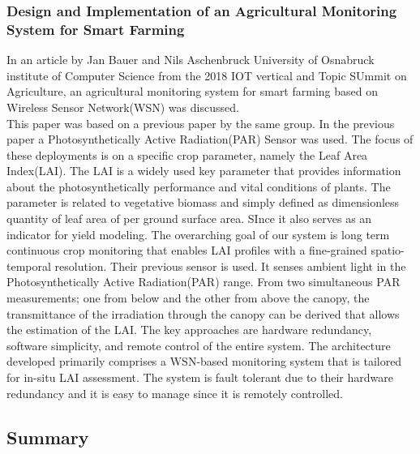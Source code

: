 \documentclass[12pt, a4paper]{article}
\begin{document}
\subsubsection{Design and Implementation of an Agricultural Monitoring System for Smart Farming}
In an article by Jan Bauer and Nils Aschenbruck University of Osnabruck institute of Computer Science from the 2018 IOT vertical and Topic SUmmit on Agriculture, an agricultural monitoring system for smart farming based on Wireless Sensor Network(WSN) was discussed.\\
This paper was based on a previous paper by the same group. In the previous paper a Photosynthetically Active Radiation(PAR) Sensor was used. The focus of these deployments is on a specific crop parameter, namely the Leaf Area Index(LAI). The LAI is a widely used key parameter that provides information about the photosynthetically performance and vital conditions of plants. The parameter is related to vegetative biomass and simply defined as dimensionless quantity of leaf area of per ground surface area. SInce it also serves as an indicator for yield modeling. The overarching goal of our system is long term continuous crop monitoring that enables LAI profiles with a fine-grained  spatio-temporal resolution. Their previous sensor is used. It senses ambient light in the Photosynthetically Active Radiation(PAR) range. From two simultaneous  PAR measurements; one from below and the other from above the canopy, the transmittance of the irradiation through the canopy can be derived that allows the estimation of the LAI. The key approaches are hardware redundancy, software simplicity, and remote control of the entire system. The architecture developed primarily comprises a WSN-based monitoring system that is tailored for in-situ LAI assessment. The system is fault tolerant due to their hardware redundancy and it is easy to manage since it is remotely controlled.
\subsection{Summary}
\end{document}
